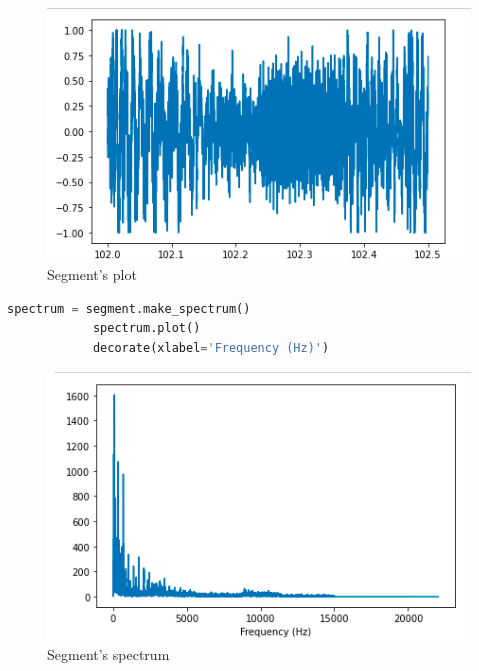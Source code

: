\documentclass[a4paper]{article}
\begin{document}
        \begin{figure}[H]
            \centering
            \includegraphics[width=\textwidth]{img/seg_wave.png}
            \caption{Segment's plot}
            \label{fig:segment_plot}
        \end{figure}
            
        \begin{lstlisting}[language=Python,caption=Segment spectrum calculation,label={lst:seg_spec_ext}]
            spectrum = segment.make_spectrum()
            spectrum.plot()
            decorate(xlabel='Frequency (Hz)')
        \end{lstlisting}

        \begin{figure}[H]
            \centering
            \includegraphics[width=\textwidth]{img/seg_spec.png}
            \caption{Segment's spectrum}
            \label{fig:seg_spec_plot}
        \end{figure}
            
\end{document}
